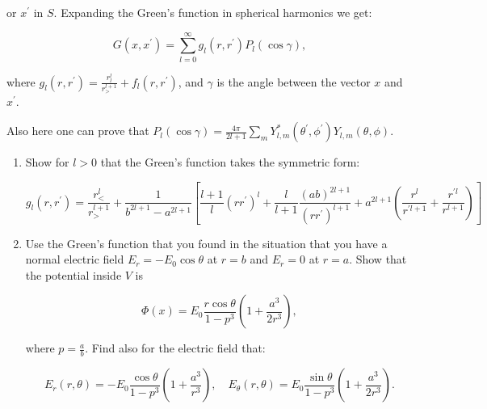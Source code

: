 or $x^{\prime}$ in $S$. Expanding the Green's function in spherical harmonics we get:

\begin{equation}
	G\left(x, x^{\prime}\right)=\sum_{l=0}^{\infty} g_{l}\left(r, r^{\prime}\right) P_{l}(\cos \gamma),
\end{equation}

where $g_{l}\left(r, r^{\prime}\right)=\frac{r_{l}^{l}}{r_{>}^{l+1}}+f_{l}\left(r, r^{\prime}\right)$, and $\gamma$ is the angle between the vector $x$ and $x^{\prime}$.

Also here one can prove that $P_{l}(\cos \gamma)=\frac{4 \pi}{2 l+1} \sum_{m} Y_{l, m}^{*}\left(\theta^{\prime}, \phi^{\prime}\right) Y_{l, m}(\theta, \phi)$.

\begin{enumerate}
	\item Show for $l>0$ that the Green's function takes the symmetric form:
	
	\begin{equation}
		g_{l}\left(r, r^{\prime}\right)=\frac{r_{<}^{l}}{r_{>}^{l+1}}+\frac{1}{b^{2 l+1}-a^{2 l+1}}\left[\frac{l+1}{l}\left(r r^{\prime}\right)^{l}+\frac{l}{l+1} \frac{(a b)^{2 l+1}}{\left(r r^{\prime}\right)^{l+1}}+a^{2 l+1}\left(\frac{r^{l}}{r^{\prime l+1}}+\frac{r^{\prime l}}{r^{l+1}}\right)\right]
	\end{equation}

	\item Use the Green's function that you found in the situation that you have a normal electric field $E_{r}=-E_{0} \cos \theta$ at $r=b$ and $E_{r}=0$ at $r=a$. Show that the potential inside $V$ is
	
	\begin{equation}
		\Phi(x)=E_{0} \frac{r \cos \theta}{1-p^{3}}\left(1+\frac{a^{3}}{2 r^{3}}\right),
	\end{equation}

	where $p=\frac{a}{b}$. Find also for the electric field that:
	
	\begin{equation}
		E_{r}(r, \theta)=-E_{0} \frac{\cos \theta}{1-p^{3}}\left(1+\frac{a^{3}}{r^{3}}\right), \quad E_{\theta}(r, \theta)=E_{0} \frac{\sin \theta}{1-p^{3}}\left(1+\frac{a^{3}}{2 r^{3}}\right) .
	\end{equation}
\end{enumerate}